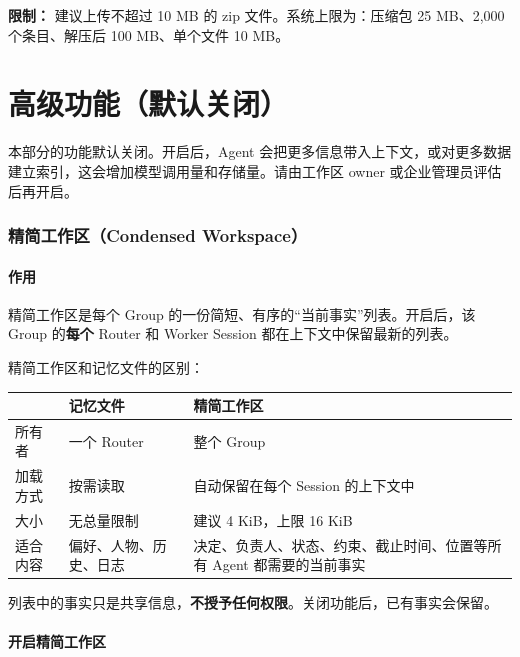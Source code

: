 \documentclass[UTF8,a4paper,11pt]{ctexart}
\begin{document}
\textbf{限制：} 建议上传不超过 10 MB 的 zip 文件。系统上限为：压缩包 25 MB、2,000 个条目、解压后 100 MB、单个文件 10 MB。

\clearpage
\part{高级功能（默认关闭）}

\begin{warn}[开启前请阅读]
本部分的功能默认关闭。开启后，Agent 会把更多信息带入上下文，或对更多数据建立索引，这会增加模型调用量和存储量。请由工作区 owner 或企业管理员评估后再开启。
\end{warn}

\section{精简工作区（Condensed Workspace）}

\subsection{作用}

精简工作区是每个 Group 的一份简短、有序的“当前事实”列表。开启后，该 Group 的\textbf{每个} Router 和 Worker Session 都在上下文中保留最新的列表。

精简工作区和记忆文件的区别：

\begin{longtable}{P{3.0cm}P{5.2cm}P{5.6cm}}
\toprule
 & 记忆文件 & 精简工作区 \\
\midrule
\endhead
所有者 & 一个 Router & 整个 Group \\
加载方式 & 按需读取 & 自动保留在每个 Session 的上下文中 \\
大小 & 无总量限制 & 建议 4 KiB，上限 16 KiB \\
适合内容 & 偏好、人物、历史、日志 & 决定、负责人、状态、约束、截止时间、位置等所有 Agent 都需要的当前事实 \\
\bottomrule
\end{longtable}

列表中的事实只是共享信息，\textbf{不授予任何权限}。关闭功能后，已有事实会保留。

\subsection{开启精简工作区}
\end{document}

